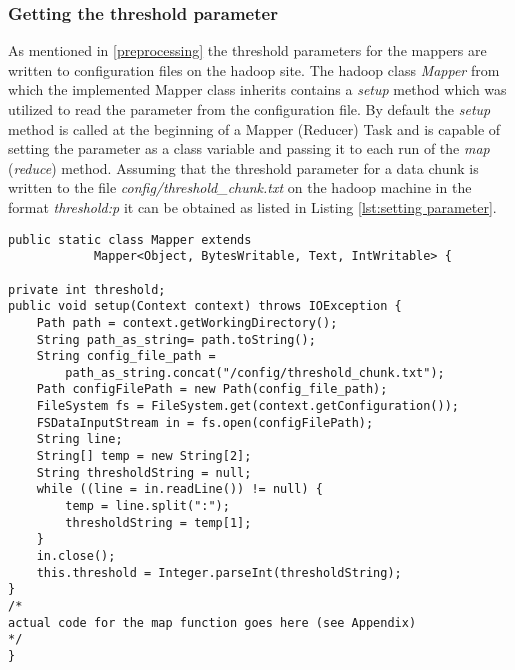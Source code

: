 \subsubsection{Getting the threshold parameter}\label{set parameter}
As mentioned in \ref{preprocessing} the threshold parameters for the mappers are written to configuration files on the hadoop site. The hadoop class \textit{Mapper} from which the implemented Mapper class inherits contains a \textit{setup} method which was utilized to read the parameter from the configuration file. By default the \textit{setup} method is called at the beginning of a Mapper (Reducer) Task and is capable of setting the parameter as a class variable and passing it to each run of the \textit{map} (\textit{reduce}) method. Assuming that the threshold parameter for a data chunk is written to the file \textit{config/threshold\_chunk.txt} on the hadoop machine in the format \textit{threshold:p} it can be obtained as listed in Listing \ref{lst:setting parameter}.
\begin{lstlisting}[caption={setting the threshold parameter},captionpos=b,label={lst:setting parameter}]
public static class Mapper extends
			Mapper<Object, BytesWritable, Text, IntWritable> {
			
private int threshold;
public void setup(Context context) throws IOException {
	Path path = context.getWorkingDirectory();
	String path_as_string= path.toString();
	String config_file_path = 
		path_as_string.concat("/config/threshold_chunk.txt");
	Path configFilePath = new Path(config_file_path);
	FileSystem fs = FileSystem.get(context.getConfiguration());
	FSDataInputStream in = fs.open(configFilePath);
	String line;
	String[] temp = new String[2];
	String thresholdString = null;
	while ((line = in.readLine()) != null) {
		temp = line.split(":");
		thresholdString = temp[1];
	}
	in.close();
	this.threshold = Integer.parseInt(thresholdString);
}
/*
actual code for the map function goes here (see Appendix)
*/
}
\end{lstlisting}
